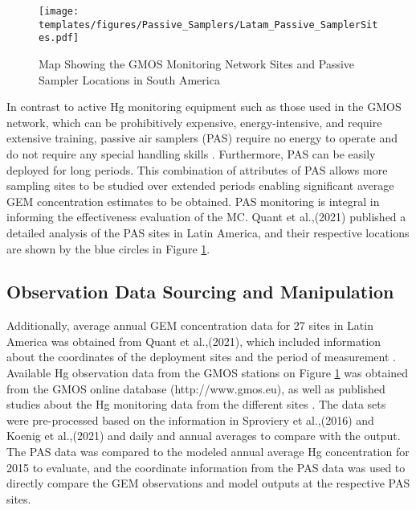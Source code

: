 \begin{figure}[H]
 \centering
  \texttt{[image: templates/figures/Passive\_Samplers/Latam\_Passive\_SamplerSites.pdf]}
  \caption{Map Showing the GMOS Monitoring Network Sites and Passive Sampler Locations in South America \cite{quant_measuring_2021,koenig_seasonal_2021}}
  \label{fig:Latam_Passive_SamplerSites}
\end{figure}
\FloatBarrier

\begin{flushleft}
    In contrast to active Hg monitoring equipment such as those used in the GMOS network, which can be prohibitively expensive, energy-intensive, and require extensive training, passive air samplers (PAS) require no energy to operate and do not require any special handling skills \cite{quant_measuring_2021}. Furthermore, PAS can be easily deployed for long periods. This combination of attributes of PAS allows more sampling sites to be studied over extended periods enabling significant average GEM concentration estimates to be obtained. PAS monitoring is integral in informing the effectiveness evaluation of the MC\cite{gustin_measuring_2015,unep_guidance_2021}. Quant et al.,(2021) published a detailed analysis of the PAS sites in Latin America, and their respective locations are shown by the blue circles in Figure \ref{fig:Latam_Passive_SamplerSites}. 
\end{flushleft}

\subsection{Observation Data Sourcing and Manipulation}
\begin{flushleft}
  Additionally, average annual GEM concentration data for 27 sites in Latin America was obtained from Quant et al.,(2021), which included information about the coordinates of the deployment sites and the period of measurement \cite{quant_measuring_2021}. Available Hg observation data from the GMOS stations on Figure  \ref{fig:Latam_Passive_SamplerSites} was obtained from the GMOS online database (http://www.gmos.eu), as well as published studies about the Hg monitoring data from the different sites  \cite{koenig_seasonal_2021}. The data sets were pre-processed based on the information in Sproviery et al.,(2016) and Koenig et al.,(2021) and daily and annual averages to compare with the \gc output\cite{koenig_seasonal_2021,sprovieri_atmospheric_2016}. The PAS data was compared to the modeled annual average Hg concentration for 2015 to evaluate, and the coordinate information from the PAS data was used to directly compare the GEM observations and model outputs at the respective PAS sites.
\end{flushleft}





